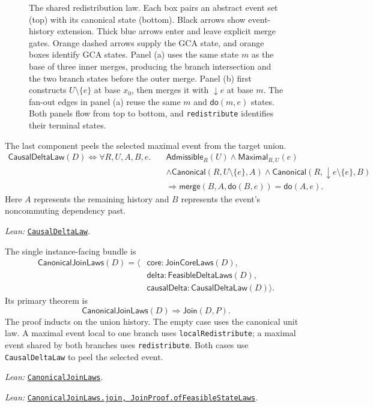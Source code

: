 \documentclass[11pt]{article}
\theoremstyle{definition}
\newcommand{\doop}{\mathsf{do}}
\newcommand{\merge}{\mathsf{merge}}
\newcommand{\Can}{\mathsf{Canonical}}
\newcommand{\lean}[1]{\texttt{#1}}
\newcommand{\src}[2]{\href{../../#1}{\texttt{#2}}}
\newcommand{\anchor}[2]{\par\smallskip\noindent\emph{Lean: }\src{#1}{#2}.}
\begin{document}
\begin{figure}[htp]
\caption{The shared redistribution law. Each box pairs an abstract event set
(top) with its canonical state (bottom). Black arrows show event-history
extension. Thick blue arrows enter and leave explicit merge gates. Orange
dashed arrows supply the GCA state, and orange boxes identify GCA states.
Panel (a) uses the same state $m$ as the base of three inner merges, producing
the branch intersection and the two branch states before the outer merge.
Panel (b) first constructs $U\setminus\{e\}$ at base $x_0$, then merges it
with $\downarrow e$ at base $m$. The fan-out edges in panel (a) reuse the
same $m$ and $\doop(m,e)$ states. Both panels flow from top to bottom, and
\lean{redistribute} identifies their terminal states.}
\label{fig:redistribute}
\end{figure}
\clearpage

The last component peels the selected maximal event from the target union.
\[
\begin{aligned}
 \mathsf{CausalDeltaLaw}(D)\Longleftrightarrow
 \forall R,U,A,B,e.\quad
 &\mathsf{Admissible}_R(U)
 \land\mathsf{Maximal}_{R,U}(e)\\
 &\land\Can(R,U\setminus\{e\},A)
 \land\Can(R,\downarrow e\setminus\{e\},B)\\
 &\Longrightarrow
 \merge(B,A,\doop(B,e))=\doop(A,e).
\end{aligned}
\]
Here $A$ represents the remaining history and $B$ represents the event's
noncommuting dependency past.
\anchor{Sal/MRDTs/Framework/MergeLaws.lean}{CausalDeltaLaw}

The single instance-facing bundle is
\[
\begin{aligned}
 \mathsf{CanonicalJoinLaws}(D)=\langle
 &\mathsf{core}:\mathsf{JoinCoreLaws}(D),\\
 &\mathsf{delta}:\mathsf{FeasibleDeltaLaws}(D),\\
 &\mathsf{causalDelta}:\mathsf{CausalDeltaLaw}(D)\rangle.
\end{aligned}
\]
Its primary theorem is
\[
 \mathsf{CanonicalJoinLaws}(D)\Longrightarrow\mathsf{Join}(D,P).
\]
The proof inducts on the union history. The empty case uses the canonical unit
law. A maximal event local to one branch uses \lean{localRedistribute}; a
maximal event shared by both branches uses \lean{redistribute}. Both cases use
\lean{CausalDeltaLaw} to peel the selected event.
\anchor{Sal/MRDTs/Framework/MergeLaws.lean}{CanonicalJoinLaws}
\anchor{Sal/MRDTs/Metatheory/Adequacy.lean}
  {CanonicalJoinLaws.join, JoinProof.ofFeasibleStateLaws}
\end{document}
